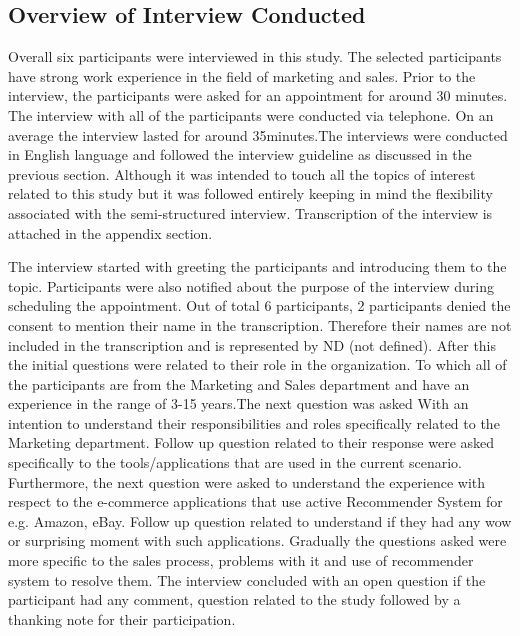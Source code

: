 \subsection{Overview of Interview Conducted}
Overall six participants were interviewed in this study. The selected participants have strong work experience in the field of marketing and sales. Prior to the interview, the participants were asked for an appointment for around 30 minutes. The interview with all of the participants were conducted via telephone. On an average the interview lasted for around 35minutes.The interviews were conducted in English language and followed the interview guideline as discussed in the previous section. Although it was intended to touch all the topics of interest related to this study but it was followed entirely keeping in mind the flexibility associated with the semi-structured interview.  Transcription of the interview is attached in the appendix section. \\ 
\par
The interview started with greeting the participants and introducing them to the topic. Participants were also notified about the purpose of the interview during scheduling the appointment. Out of total 6 participants, 2 participants denied the consent to mention their name in the transcription. Therefore their names are not included in the transcription and is represented by ND (not defined). After this the initial questions were related to their role in the organization. To which all of the participants are from the Marketing and Sales department and have an experience in the range of 3-15 years.The next question was asked With an intention to understand their responsibilities and roles specifically related to the Marketing department. Follow up question related to their response were asked specifically to the tools/applications that are used in the current scenario. Furthermore, the next question were asked to understand the experience with respect to the e-commerce applications that use active Recommender System for e.g. Amazon, eBay. Follow up question related to understand if they had any wow or surprising moment with such applications. Gradually the questions asked were more specific to the sales process, problems with it and use of recommender system to resolve them. The interview concluded with an open question if the participant had any comment, question related to the study followed by a thanking note for their participation. 

